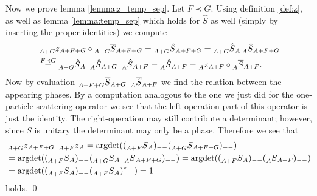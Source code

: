 \documentclass[oneside,reqno,12pt]{amsart}
\begin{document}
Now we prove lemma \ref{lemma:z_temp_sep}. Let \(F \prec G\). Using definition \eqref{def:z}, as well as lemma \ref{lemma:temp_sep} which holds for \(\hat{S}\) as well (simply by inserting the proper identities) we compute
\begin{align*}
&\prescript{}{A+G}{z}_{A+F+G} \circ \prescript{}{A+G}{\overline{S}}_{A+F+G}
 = \prescript{}{A+G}{\hat{S}}_{A+F+G} 
 =\prescript{}{A+G}{\hat{S}}_A \prescript{}{A}{\hat{S}}_{A+F+G}\\
&\stackrel{ F\prec G}{=} \prescript{}{A+G}{\hat{S}}_{A}
 ~\prescript{}{A}{\hat{S}}_{A+G} ~\prescript{}{A}{\hat{S}}_{A+F}
 = \prescript{}{A}{\hat{S}}_{A+F}
 = \prescript{}{A}{z}_{A+F}\circ \prescript{}{A}{\overline{S}}_{A+F}.
\end{align*}
Now by evaluation \(\prescript{}{A+F+G}{\overline{S}}_{A+G} ~\prescript{}{A}{\overline{S}}_{A+F}\)  we find the relation between the appearing phases. By a computation analogous to the one we just did for the one-particle scattering operator we see that the left-operation part of this operator is just the identity. The right-operation may still contribute a determinant; however, since \(\overline{S}\) is unitary the determinant may only be a phase. Therefore we see that
\begin{align*}
&\prescript{}{A+G}{z}_{A+F+G} ~\prescript{}{A+F}{z}_{A} 
= \text{argdet}((\prescript{}{A+F}{S}_A)_{--} (\prescript{}{A+G}{S}_{A+F+G})_{--})\\
&= \text{argdet}((\prescript{}{A+F}{S}_A)_{--} (\prescript{}{A+G}{S}_A ~ \prescript{}{A}{S}_{A+F+G})_{--})
= \text{argdet}((\prescript{}{A+F}{S}_A)_{--} ( \prescript{}{A}{S}_{A+F})_{--})\\
&= \text{argdet}((\prescript{}{A+F}{S}_A)_{--} ( \prescript{}{A+F}{S}_{A})^*_{--})=1
\end{align*}
holds.
\qed
\end{document}
